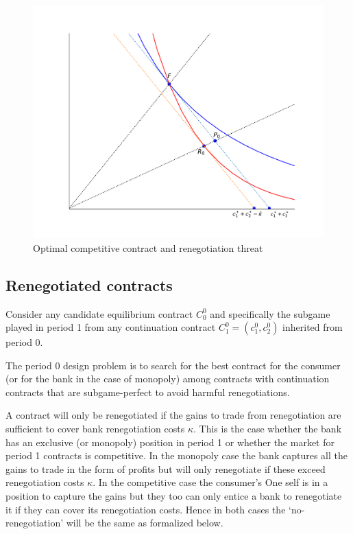 \documentclass[11pt,english]{article}
\theoremstyle{plain}
\theoremstyle{definition}
\begin{document}
\begin{figure}
\includegraphics[width=\textwidth]{renegotiation.pdf}
\caption[Full-commitment and renegotiation-proof contracts under competition]{Optimal competitive contract and renegotiation threat }

\label{fig:c1c2} 
\end{figure}

\subsection{Renegotiated contracts}

Consider any candidate equilibrium contract \(C_{0}^{0}\) and specifically the subgame played in period 1 from any continuation
contract $C_{1}^{0}=(c_{1}^{0},c_{2}^{0})$ inherited from period
0. 

The period 0 design problem is to search for the best contract for the consumer (or for the bank in the case of monopoly) among contracts with continuation
contracts that are subgame-perfect to avoid harmful renegotiations.

A contract will only be renegotiated if the gains to trade from renegotiation are sufficient to cover bank renegotiation costs $\kappa $. This is the case whether the bank has an exclusive (or monopoly) position in period 1 or whether the market for period 1 contracts is competitive.  In the monopoly case the bank captures all the gains to trade in the form of profits but will only renegotiate if these exceed renegotiation costs $\kappa$.  In the competitive case the consumer's One self is in a position to capture the gains but they too can only entice a bank to renegotiate it if they can cover its renegotiation costs. Hence in both cases the `no-renegotiation' will be the same as formalized below. 
\end{document}
